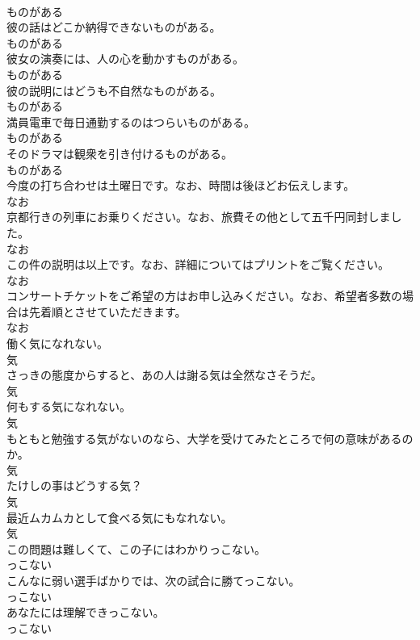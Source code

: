 \documentclass[8pt]{extreport}
\begin{document}
\begin{CJK}{UTF8}{min}
\\	ものがある
\\	彼の話はどこか納得できないものがある。	
\\	ものがある
\\	彼女の演奏には、人の心を動かすものがある。	
\\	ものがある
\\	彼の説明にはどうも不自然なものがある。	
\\	ものがある
\\	満員電車で毎日通勤するのはつらいものがある。	
\\	ものがある
\\	そのドラマは観衆を引き付けるものがある。	
\\	ものがある
\\	今度の打ち合わせは土曜日です。なお、時間は後ほどお伝えします。	
\\	なお
\\	京都行きの列車にお乗りください。なお、旅費その他として五千円同封しました。	
\\	なお
\\	この件の説明は以上です。なお、詳細についてはプリントをご覧ください。	
\\	なお
\\	コンサートチケットをご希望の方はお申し込みください。なお、希望者多数の場合は先着順とさせていただきます。	
\\	なお
\\	働く気になれない。	
\\	気
\\	さっきの態度からすると、あの人は謝る気は全然なさそうだ。	
\\	気
\\	何もする気になれない。	
\\	気
\\	もともと勉強する気がないのなら、大学を受けてみたところで何の意味があるのか。	
\\	気
\\	たけしの事はどうする気？	
\\	気
\\	最近ムカムカとして食べる気にもなれない。	
\\	気
\\	この問題は難しくて、この子にはわかりっこない。	
\\	っこない
\\	こんなに弱い選手ばかりでは、次の試合に勝てっこない。	
\\	っこない
\\	あなたには理解できっこない。	
\\	っこない

\end{CJK}
\end{document}

